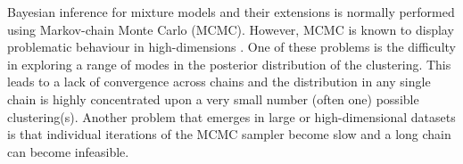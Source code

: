 \documentclass{bioinfo}
\begin{document}
Bayesian inference for mixture models and their extensions is normally performed using Markov-chain Monte Carlo (MCMC). However, MCMC is known to display problematic behaviour in high-dimensions \citep{robert2018accelerating, yao2020stacking, chandra2020bayesian}. One of these problems is the difficulty in exploring a range of modes in the posterior distribution of the clustering. This leads to a lack of convergence across chains and the distribution in any single chain is highly concentrated upon a very small number (often one) possible clustering(s). Another problem that emerges in large or high-dimensional datasets is that individual iterations of the MCMC sampler become slow and a long chain can become infeasible.


%
\end{document}

